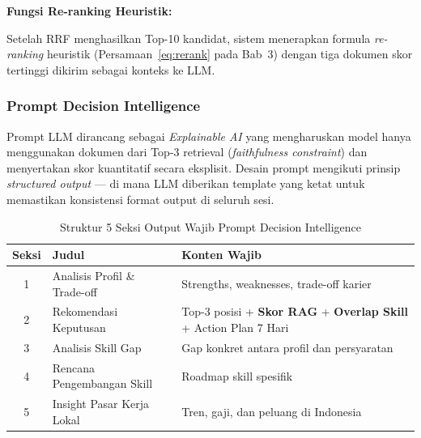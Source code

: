 \textbf{Fungsi Re-ranking Heuristik:}

Setelah RRF menghasilkan Top-10 kandidat, sistem menerapkan formula \textit{re-ranking}
heuristik (Persamaan~\ref{eq:rerank} pada Bab~3) dengan tiga dokumen skor tertinggi
dikirim sebagai konteks ke LLM.

\subsubsection{Prompt Decision Intelligence}
\label{subsec:prompt_di}

Prompt LLM dirancang sebagai \textit{Explainable AI} yang mengharuskan model hanya
menggunakan dokumen dari Top-3 retrieval (\textit{faithfulness constraint}) dan
menyertakan skor kuantitatif secara eksplisit. Desain prompt mengikuti prinsip
\textit{structured output} --- di mana LLM diberikan template yang ketat untuk
memastikan konsistensi format output di seluruh sesi.

\begin{table}[H]
\centering
\caption{Struktur 5 Seksi Output Wajib Prompt Decision Intelligence}
\label{tab:prompt}
\begin{tabularx}{\textwidth}{clX}
\toprule
\textbf{Seksi} & \textbf{Judul} & \textbf{Konten Wajib} \\
\midrule
1 & Analisis Profil \& Trade-off & Strengths, weaknesses, trade-off karier \\
2 & Rekomendasi Keputusan & Top-3 posisi + \textbf{Skor RAG} + \textbf{Overlap Skill} + Action Plan 7 Hari \\
3 & Analisis Skill Gap & Gap konkret antara profil dan persyaratan \\
4 & Rencana Pengembangan Skill & Roadmap skill spesifik \\
5 & Insight Pasar Kerja Lokal & Tren, gaji, dan peluang di Indonesia \\
\bottomrule
\end{tabularx}
\end{table}

